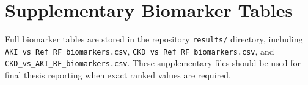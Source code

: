 \chapter{Supplementary Biomarker Tables}
Full biomarker tables are stored in the repository \texttt{results/} directory, including \texttt{AKI\_vs\_Ref\_RF\_biomarkers.csv}, \texttt{CKD\_vs\_Ref\_RF\_biomarkers.csv}, and \texttt{CKD\_vs\_AKI\_RF\_biomarkers.csv}. These supplementary files should be used for final thesis reporting when exact ranked values are required.
